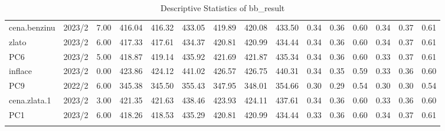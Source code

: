 \begin{longtable}{p{1.5cm}p{1.0cm}p{1.5cm}p{1.0cm}p{1.0cm}p{1.0cm}p{1.0cm}p{1.0cm}p{1.0cm}p{1.0cm}p{1.0cm}p{1.0cm}p{1.0cm}p{1.0cm}p{1.0cm}}
  cena.benzinu & 2023/2 & 7.00 & 416.04 & 416.32 & 433.05 & 419.89 & 420.08 & 433.50 & 0.34 & 0.36 & 0.60 & 0.34 & 0.37 & 0.61 \\ 
  zlato & 2023/2 & 6.00 & 417.33 & 417.61 & 434.37 & 420.81 & 420.99 & 434.44 & 0.34 & 0.36 & 0.60 & 0.34 & 0.37 & 0.61 \\ 
  PC6 & 2023/2 & 5.00 & 418.87 & 419.14 & 435.92 & 421.69 & 421.87 & 435.34 & 0.34 & 0.36 & 0.60 & 0.33 & 0.37 & 0.61 \\ 
  inflace & 2023/2 & 0.00 & 423.86 & 424.12 & 441.02 & 426.57 & 426.75 & 440.31 & 0.34 & 0.35 & 0.59 & 0.33 & 0.36 & 0.60 \\ 
  PC9 & 2022/2 & 6.00 & 345.38 & 345.50 & 355.43 & 347.95 & 348.01 & 354.66 & 0.30 & 0.29 & 0.54 & 0.30 & 0.30 & 0.54 \\ 
  cena.zlata.1 & 2023/2 & 3.00 & 421.35 & 421.63 & 438.46 & 423.93 & 424.11 & 437.61 & 0.34 & 0.36 & 0.60 & 0.33 & 0.36 & 0.60 \\ 
  PC1 & 2023/2 & 6.00 & 418.26 & 418.53 & 435.29 & 420.81 & 420.99 & 434.44 & 0.33 & 0.36 & 0.60 & 0.34 & 0.37 & 0.61 \\ 
   \hline
\hline
\caption{Descriptive Statistics of bb_result} 
\label{tab:bb_result}
\end{longtable}
